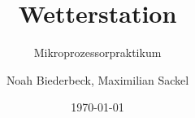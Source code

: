 \documentclass{beamer}
\title{Wetterstation}
\subtitle{Mikroprozessorpraktikum}
\date{\today}
\author{Noah Biederbeck, Maximilian Sackel}
\begin{document}
\maketitle










\begin{frame}[standout]\end{frame}
\end{document}
